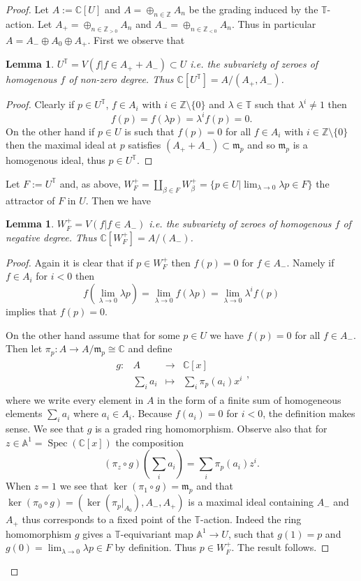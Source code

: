 \documentclass[12pt]{article}
\numberwithin{equation}{section}
\newtheorem{lemma}[theorem]{Lemma}
\theoremstyle{remark}
\theoremstyle{definition}
\numberwithin{theorem}{section}
\def\bes{\begin{eqnarray*}}
\def\ees{\end{eqnarray*}}
\DeclareMathOperator{\Spec}{Spec}
\def\A{{\mathbb A}}
\def\C{\mathbb{C}}
\newcommand{\T}{{\mathbb{T}}}
\def\Z{\mathbb{Z}}
\def\m{{\mathfrak m}}
\renewcommand{\1}{\mathbbm{1}}
\begin{document}
\begin{proof}
	Let $A:=\C[U]$ and $A=\oplus_{n\in \Z} A_n$ be the grading induced by the $\T$-action. Let $A_+=\oplus_{n\in \Z_{>0}} A_n$ and $A_-=\oplus_{n\in \Z_{<0}} A_n$. Thus in particular $A=A_-\oplus A_0\oplus A_+$.  First we observe that 
	
	\begin{lemma} $U^\T=V(f|f\in A_++A_-)\subset U$ i.e. the subvariety of zeroes of homogenous $f$ of non-zero degree. Thus $\C[U^\T]=A/(A_+,A_-)$. \end{lemma}
	\begin{proof} Clearly if $p\in U^\T$, $f \in A_i$ with $i\in \Z\setminus \{0\}$    and $\lambda\in \T$ such that $\lambda^i\neq 1$ then $$f(p)=f(\lambda p)=\lambda^if(p)=0.$$ On the other hand if $p\in U$ is such that  $f(p) =0$  for all $f\in A_i$ with $i\in \Z\setminus \{0\}$ then the maximal ideal at $p$ satisfies $(A_++A_-)\subset \m_p$  and so $\m_p$ is a homogenous ideal, thus $p\in U^\T$. \end{proof}
	
	Let $F:=U^\T$ and, as above, $W^+_{F}=\coprod_{\beta\in F} W^+_\beta=\{p\in U|\lim_{\lambda\to 0}\lambda p\in F\}$ the attractor of $F$ in $U$. Then we have 
	\begin{lemma} \label{ringofw} $W^+_{F}=V(f|f\in A_-)$ i.e. the subvariety of zeroes of homogenous $f$ of negative degree. Thus $\C[W^+_{F}]=A/(A_-)$. 
	\end{lemma}
	\begin{proof} Again it is clear that if $p\in W^+_{F}$ then $f(p)=0$ for $f\in A_-$. Namely if $f\in A_i$ for $i<0$ then $$f(\lim_{\lambda\to 0} \lambda p)=\lim_{\lambda\to 0} f(\lambda p)=\lim_{\lambda\to 0} \lambda^{i} f(p)$$ implies that $f(p)=0$.
		
		On the other hand assume that for some $p\in U$ we have  $f(p)=0$ for all $f\in A_-$. Then let $\pi_p:A\to A/\m_p\cong \C$ and define \bes \begin{array}{cccc}g:&A&\to& \C[x]\\ &\sum_i a_i&\mapsto& \sum_i \pi_p(a_i)x^i
		\end{array},\ees where we write every element in $A$ in the form of a finite sum of homogeneous elements $\sum_i a_i$ where $a_i\in A_i$. Because $f(a_i)=0$ for $i<0$, the definition makes sense. We see that $g$ is a graded ring homomorphism.  Observe also that for $z\in \A^1=\Spec(\C[x])$ the composition $$(\pi_{z}\circ g)\left(\sum_i a_i\right)=\sum_i \pi_p(a_i)z^i.$$ When $z= 1$ we see that $\ker(\pi_{1}\circ g)=\m_{p}$ and that $\ker(\pi_0\circ g)=(\ker(\pi_p|_{A_0}),A_-,A_+)$ is a maximal ideal containing $A_-$ and $A_+$ thus corresponds to a fixed point of the $\T$-action. Indeed the ring homomorphism $g$ gives a $\T$-equivariant map $\A^1\to U$, such that $g(1)=p$ and $g(0)=\lim_{\lambda\to 0} \lambda p\in F$ by  definition. Thus $p\in W^+_{F}$. The result follows.
	\end{proof}
	

\end{proof}
\end{document}
